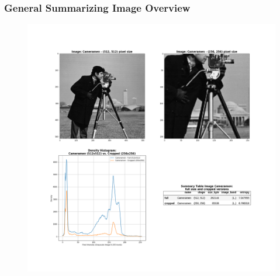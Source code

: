 \begin{frame}
\frametitle{General Summarizing Image Overview}
\begin{figure}
\includegraphics[scale=0.15]{slides/experiments/target-image/complex_3.png}
\end{figure}
\end{frame}